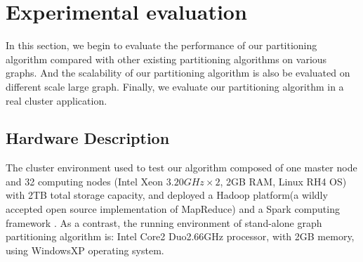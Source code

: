\documentclass{acm_proc_article-sp}
\begin{document}
\section{Experimental evaluation}
In this section, we begin to evaluate the performance of our partitioning algorithm compared with other existing partitioning algorithms on various graphs. And the scalability of our partitioning algorithm is also be evaluated on different scale large graph. Finally, we evaluate our partitioning algorithm in a real cluster application.

\subsection {Hardware Description}
The cluster environment used to test our algorithm composed of one master node and 32 computing nodes (Intel Xeon $3.20GHz\times2$, 2GB RAM, Linux RH4 OS) with 2TB total storage capacity, and deployed a Hadoop platform(a wildly accepted open source implementation of MapReduce) and a Spark computing framework \cite{Berkeley:spark}. As a contrast, the running environment of stand-alone graph partitioning algorithm is: Intel Core2 Duo2.66GHz processor, with 2GB memory, using WindowsXP operating system.
\end{document}
